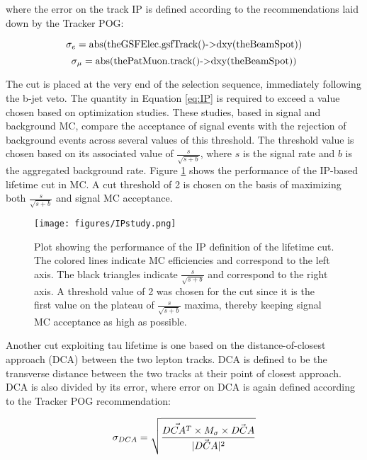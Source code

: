 \noindent where the error on the track IP is defined according to the recommendations laid down by the Tracker POG\cite{TrackerPOG}:

\begin{equation}
\centering
\sigma_e = \textrm{abs(theGSFElec.gsfTrack()-$>$dxy(theBeamSpot))}
\end{equation}
\begin{equation}
\centering
\sigma_\mu = \textrm{abs(thePatMuon.track()-$>$dxy(theBeamSpot))}
\end{equation}

The cut is placed at the very end of the selection sequence, immediately following the b-jet veto. The quantity in Equation \ref{eq:IP} is required to exceed a value chosen based on optimization studies. These studies, based in signal and background MC, compare the acceptance of signal events with the rejection of background events across several values of this threshold. The threshold value is chosen based on its associated value of $\frac{s}{\sqrt{s+b}}$, where $s$ is the signal rate and $b$ is the aggregated background rate. Figure \ref{fig:IPstudy} shows the performance of the IP-based lifetime cut in MC. A cut threshold of 2 is chosen on the basis of maximizing both $\frac{s}{\sqrt{s+b}}$ and signal MC acceptance.


\begin{figure}[tbh!]
\centering
\texttt{[image: figures/IPstudy.png]}
\caption{Plot showing the performance of the IP definition of the lifetime cut. The colored lines indicate MC efficiencies and correspond to the left axis. The black triangles indicate $\frac{s}{\sqrt{s+b}}$ and correspond to the right axis. A threshold value of 2 was chosen for the cut since it is the first value on the plateau of $\frac{s}{\sqrt{s+b}}$ maxima, thereby keeping signal MC acceptance as high as possible.}
\label{fig:IPstudy}
\end{figure}


Another cut exploiting tau lifetime is one based on the distance-of-closest approach (DCA) between the two lepton tracks. DCA is defined to be the transverse distance between the two tracks at their point of closest approach. DCA is also divided by its error, where error on DCA is again defined according to the Tracker POG recommendation\cite{TrackerPOG}:

\begin{equation}
\centering
\sigma_{DCA} = \sqrt{\frac{\vec{DCA^T}\times M_\sigma\times\vec{DCA}}{|\vec{DCA}|^2}}
\end{equation}

